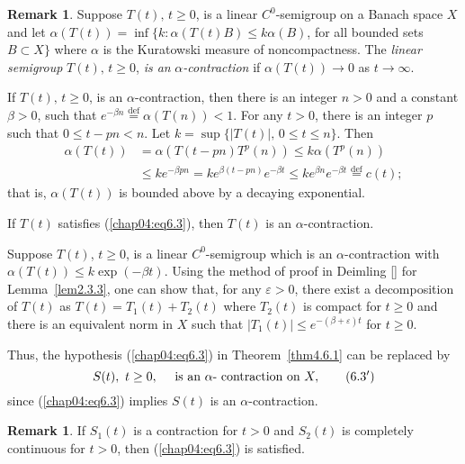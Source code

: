 \documentclass{surv-l}
\theoremstyle{plain}
\theoremstyle{definition}
\newtheorem{remark}[theorem]{Remark}
\numberwithin{equation}{section}
\numberwithin{figure}{chapter}
\begin{document}
\begin{remark}\label{rem4.6.2} Suppose $T(t),\, t\geq 0$, is a linear $C^{0}$-semigroup on a Banach space $X$ and let $\alpha(T(t))=\inf\{k:\alpha(T(t)B)\leq k\alpha(B)$, for all bounded sets $B\subset X\}$ where $\alpha$ is the Kuratowski measure of noncompactness. The \emph{linear semigroup} $T(t),\, t\geq 0$, \emph{is an} $\alpha$\emph{-contraction} if $\alpha(T(t))\rightarrow 0$ as $ t\rightarrow\infty$.

If $T(t),\, t\geq 0$, is an $\alpha$-contraction, then there is an integer $n>0$ and a constant $\beta>0$, such that $e^{-\beta n}\overset{\mathrm{def}}{=}\alpha(T(n))<1$. For any $t>0$, there is an integer $p$ such that $0\leq t-pn<n$. Let $k=\sup\{|T(t)|, \,0\leq t\leq n\}$. Then
\begin{align*}
\alpha(T(t))&=\alpha(T(t-pn)T^{p}(n))\leq k\alpha(T^{p}(n))\\
&\leq ke^{-\beta pn}=ke^{\beta(t-pn)}e^{-\beta t}\leq ke^{\beta n}e^{-\beta t}\overset{\mathrm{def}}{=}c(t);
\end{align*}
that is, $\alpha(T(t))$ is bounded above by a decaying exponential.

If $T(t)$ satisfies (\ref{chap04:eq6.3}), then $T(t)$ is an $\alpha$-contraction.

Suppose $T(t)$, $t\geq 0$, is a linear $C^{0}$-semigroup which is an $\alpha$-contraction with $\alpha(T(t))\leq k\exp(-\beta t)$. Using the method of proof in Deimling [\citeyear{1985d}] for Lemma~\ref{lem2.3.3}, one can show that, for any $\varepsilon >0$, there exist a decomposition of $T(t)$ as $T(t)=T_{1}(t)+T_{2}(t)$ where $T_{2}(t)$ is compact for $t\geq 0$ and there is an equivalent norm in $X$ such that $|T_{1}(t)|\leq e^{-(\beta+\varepsilon)t}$ for $t\geq 0$.

Thus, the hypothesis (\ref{chap04:eq6.3}) in Theorem~\ref{thm4.6.1} can be replaced by
\begin{equation}\label{chap04:eq6.3'}
S(t),\, \,t\geq 0,\quad\text{ is an }\alpha\text{-}\text{ contraction on } X, \tag{${6.3}^{\prime}$}
\end{equation}
since (\ref{chap04:eq6.3}) implies $S(t)$ is an $\alpha$-contraction.
\end{remark}

\begin{remark}\label{rem4.6.3} If $S_{1}(t)$ is a contraction for $t>0$ and $S_{2}(t)$ is completely continuous for $t>0$, then (\ref{chap04:eq6.3}) is satisfied.
\end{remark}
\end{document}
